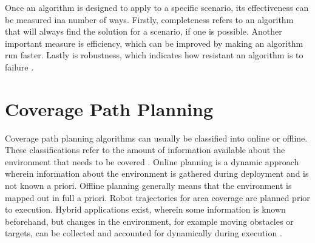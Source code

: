 
Once an algorithm is designed to apply to a specific scenario, its effectiveness can be measured ina  number of ways. Firstly, completeness refers to an algorithm that will always find the solution for a scenario, if one is possible\cite{Lavalle2006}. Another important measure is efficiency, which can be improved by making an algorithm run faster. Lastly is robustness, which indicates how resistant an algorithm is to failure \cite{Hazon2005}. 

\section{Coverage Path Planning}
Coverage path planning algorithms can usually be classified into online or offline. These classifications refer to the amount of information available about the environment that needs to be covered \cite{CPP-Survey-2019}. Online planning is a dynamic approach wherein information about the environment is gathered during deployment and is not known a priori. Offline planning generally means that the environment is mapped out in full a priori. Robot trajectories for area coverage are planned prior to execution. Hybrid applications exist, wherein some information is known beforehand, but changes in the environment, for example moving obstacles or targets, can be collected and accounted for dynamically during execution \cite{Kamrani2014}.


